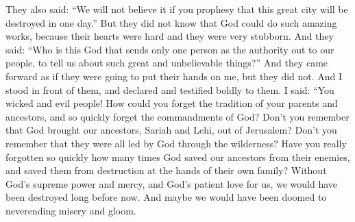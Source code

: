 They also said: ``We will not believe it if you prophesy that this great city will be destroyed in one day.''
\bverse \iffalse Now they knew not that God could do such marvelous works, for they were a hard-hearted and a stiffnecked people. \fi
But they did not know that God could do such amazing works, because their hearts were hard and they were very stubborn.
\bverse \iffalse And they said: Who is God, that sendeth no more authority than one man among this people, to declare unto them the truth of such great and marvelous things? \fi
And they said: ``Who is this God that sends only one person as the authority out to our people, to tell us about such great and unbelievable things?''
\bverse \iffalse And they stood forth to lay their hands on me; but behold, they did not. And I stood with boldness to declare unto them, yea, I did boldly testify unto them, saying: \fi
And they came forward as if they were going to put their hands on me, but they did not. And I stood in front of them, and declared and testified boldly to them. I said:
\bverse \iffalse Behold, O ye wicked and perverse generation, how have ye forgotten the tradition of your fathers; yea, how soon ye have forgotten the commandments of God. \fi
``You wicked and evil people! How could you forget the tradition of your parents and ancestors, and so quickly forget the commandments of God?
\bverse \iffalse Do ye not remember that our father, Lehi, was brought out of Jerusalem by the hand of God? Do ye not remember that they were all led by him through the wilderness? \fi
Don't you remember that God brought our ancestors, Sariah and Lehi, out of Jerusalem? Don't you remember that they were all led by God through the wilderness?
\bverse \iffalse And have ye forgotten so soon how many times he delivered our fathers out of the hands of their enemies, and preserved them from being destroyed, even by the hands of their own brethren? \fi
Have you really forgotten so quickly how many times God saved our ancestors from their enemies, and saved them from destruction at the hands of their own family?
\bverse \iffalse Yea, and if it had not been for his matchless power, and his mercy, and his long-suffering towards us, we should unavoidably have been cut off from the face of the earth long before this period of time, and perhaps been consigned to a state of endless misery and woe. \fi
Without God's supreme power and mercy, and God's patient love for us, we would have been destroyed long before now. And maybe we would have been doomed to neverending misery and gloom.
